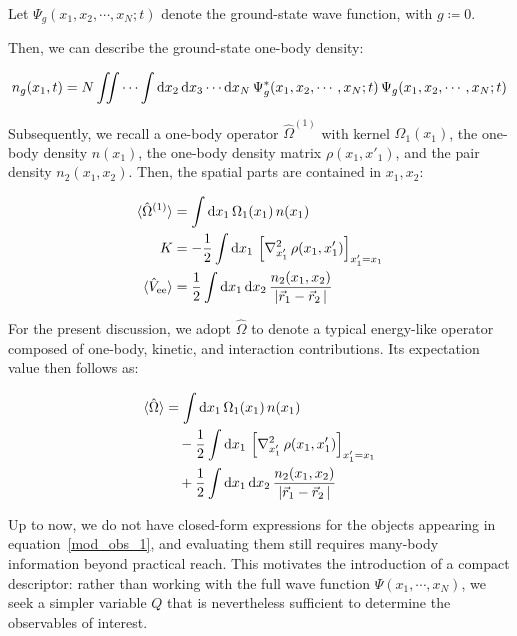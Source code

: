 Let $\Psi_g(x_1,x_2,\cdots,x_N;t)$ denote the ground-state wave function, with $g\coloneqq0$.

Then, we can describe the ground-state one-body density:

\begin{equation}
    n_g(x_1,t)=N\iint\cdots\int\dif{x_2}\,\dif{x_3}\cdots\dif{x_N}\,\Psi_g^*(x_1,x_2,\cdots,x_N;t)\,\Psi_g(x_1,x_2,\cdots,x_N;t) %
\label{ground_one-body_density}
\end{equation}

Subsequently, we recall a one-body operator $\hat{\Omega}^{(1)}$ with kernel $\Omega_1(x_1)$,
the one-body density $n(x_1)$,
the one-body density matrix $\rho(x_1,x'_1)$,
and the pair density $n_2(x_1,x_2)$.
Then, the spatial parts are contained in $x_1,x_2$:

\begin{equation}
\begin{aligned}
    \braket{\hat{\Omega}^{(1)}} &= \int \mathrm{d}x_1\,\Omega_1(x_1)\,n(x_1)\\
    K &= -\frac{1}{2}\int \mathrm{d}x_1\,
    \left[\nabla_{x'_1}^{2}\,\rho(x_1,x'_1)\right]_{x'_1=x_1}\\
    \braket{\hat{V}_\mathrm{ee}} &= \frac{1}{2}\int \mathrm{d}x_1\,\mathrm{d}x_2\,
    \frac{n_2(x_1,x_2)}{|\vec{r}_1-\vec{r}_2\,|}
\end{aligned}
\label{one-body_operator_with_kernel}
\end{equation}

For the present discussion, we adopt $\hat{\Omega}$ to denote a typical energy-like operator composed of one-body, kinetic, and interaction contributions.
Its expectation value then follows as:

\begin{equation}
\begin{aligned}
    \braket{\hat{\Omega}} %
    &= \int \mathrm{d}x_1\, \Omega_1(x_1)\, n(x_1) \\
    &\quad - \frac{1}{2}\int \mathrm{d}x_1\,
    \left[\nabla_{x'_1}^{2}\,\rho(x_1,x'_1)\right]_{x'_1=x_1} \\
    &\quad + \frac{1}{2}\int \mathrm{d}x_1\,\mathrm{d}x_2\,
    \frac{n_2(x_1,x_2)}{|\vec{r}_1-\vec{r}_2\,|}
\end{aligned}
\label{mod_obs_1}
\end{equation}


Up to now, we do not have closed-form expressions for the objects appearing in equation~\eqref{mod_obs_1}, and evaluating them still requires many-body information beyond practical reach.
This motivates the introduction of a compact descriptor: rather than working with the full wave function $\Psi(x_1,\cdots,x_N)$, we seek a simpler variable $Q$ that is nevertheless sufficient to determine the observables of interest.


